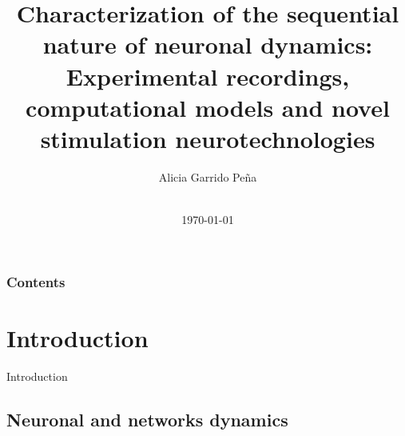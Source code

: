 \documentclass[aspectratio=43]{beamer}
\title[\meetingname]{Characterization of the sequential nature of neuronal dynamics: Experimental recordings, computational models and novel stimulation neurotechnologies}
\author[A. Garrido-Peña]{Alicia Garrido Peña}
\institute[UAM]{Universidad Autónoma de Madrid}
\date[\mydate]{\meetingname\\\today}
\begin{document}
\begin{frame}[plain,t]
\titlepage
\end{frame}

\begin{frame}
\frametitle{Contents}
\tableofcontents
\end{frame}
\section{Introduction}
    \begin{frame}{Introduction}
	
	\subsection{Neuronal and networks dynamics}
	

\end{frame}
\end{document}
